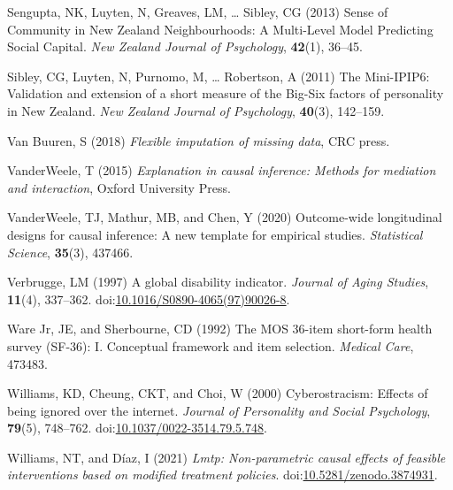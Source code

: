 \documentclass[
  singlecolumn,
  9pt]{article}
\newlength{\cslhangindent}
\newenvironment{CSLReferences}[2] %
 {\begin{list}{}{%
  \setlength{\itemindent}{0pt}
  \setlength{\leftmargin}{0pt}
  \setlength{\parsep}{0pt}
  \ifodd #1
   \setlength{\leftmargin}{\cslhangindent}
   \setlength{\itemindent}{-1\cslhangindent}
  \fi
  \setlength{\itemsep}{#2\baselineskip}}}
 {\end{list}}
\begin{document}
\begin{CSLReferences}{1}{0}
Sengupta, NK, Luyten, N, Greaves, LM, \ldots{} Sibley, CG (2013) Sense
of Community in New Zealand Neighbourhoods: A Multi-Level Model
Predicting Social Capital. \emph{New Zealand Journal of Psychology},
\textbf{42}(1), 36--45.

Sibley, CG, Luyten, N, Purnomo, M, \ldots{} Robertson, A (2011) The
Mini-IPIP6: Validation and extension of a short measure of the Big-Six
factors of personality in New Zealand. \emph{New Zealand Journal of
Psychology}, \textbf{40}(3), 142--159.

Van Buuren, S (2018) \emph{Flexible imputation of missing data}, CRC
press.

VanderWeele, T (2015) \emph{Explanation in causal inference: Methods for
mediation and interaction}, Oxford University Press.

VanderWeele, TJ, Mathur, MB, and Chen, Y (2020) Outcome-wide
longitudinal designs for causal inference: A new template for empirical
studies. \emph{Statistical Science}, \textbf{35}(3), 437466.

Verbrugge, LM (1997) A global disability indicator. \emph{Journal of
Aging Studies}, \textbf{11}(4), 337--362.
doi:\href{https://doi.org/10.1016/S0890-4065(97)90026-8}{10.1016/S0890-4065(97)90026-8}.

Ware Jr, JE, and Sherbourne, CD (1992) The MOS 36-item short-form health
survey (SF-36): I. Conceptual framework and item selection.
\emph{Medical Care}, 473483.

Williams, KD, Cheung, CKT, and Choi, W (2000) Cyberostracism: Effects of
being ignored over the internet. \emph{Journal of Personality and Social
Psychology}, \textbf{79}(5), 748--762.
doi:\href{https://doi.org/10.1037/0022-3514.79.5.748}{10.1037/0022-3514.79.5.748}.

Williams, NT, and Díaz, I (2021) \emph{Lmtp: Non-parametric causal
effects of feasible interventions based on modified treatment policies}.
doi:\href{https://doi.org/10.5281/zenodo.3874931}{10.5281/zenodo.3874931}.

\end{CSLReferences}
\end{document}
